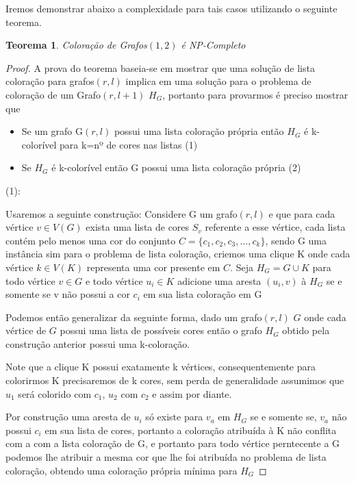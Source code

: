 \documentclass[a4paper,oneside,12pt]{book}
\newtheorem{teorema}{Teorema}
\begin{document}
Iremos demonstrar abaixo a complexidade para tais casos utilizando o seguinte teorema. 
    \begin{teorema}
      Coloração de Grafos$(1,2)$ é NP-Completo
    \end{teorema}
    \begin{proof}
      A prova do teorema baseia-se em mostrar que uma solução de lista coloração para grafos$(r,l)$ implica em uma solução para o problema de coloração de um Grafo$(r,l+1)$ $H_G$, portanto para provarmos é preciso mostrar que
      \begin{itemize}
        \item Se um grafo G$(r,l)$ possui uma lista coloração própria então $H_G$ é k-colorível para k=nº de cores nas listas (1)
        \item Se $H_G$ é k-colorível então G possui uma lista coloração própria (2)
      \end{itemize}
      (1):\newline
      
      Usaremos a seguinte construção:\newline
      Considere G um grafo$(r,l)$ e que para cada vértice $v \in V(G)$ exista uma lista de cores $S_v$ referente a esse vértice, cada lista contém pelo menos uma cor do conjunto $C = \{c_1,c_2,c_3,...,c_k \}$, sendo G uma instância sim para o problema de lista coloração, criemos uma clique K onde cada vértice $k \in V(K)$ representa uma cor presente em $C$. Seja $H_G = G \cup K$ para todo vértice $v \in G$ e todo vértice $u_i \in K$ adicione uma aresta $(u_i,v)$ à $H_G$ se e somente se v não possui a cor $c_i$ em sua lista coloração em G
      
      Podemos então generalizar da seguinte forma, dado um grafo$(r,l)$ $G$ onde cada vértice de $G$ possui uma lista de possíveis cores então o grafo $H_G$ obtido pela construção anterior possui uma k-coloração.
      
      Note que a clique K possui exatamente k vértices, consequentemente para colorirmos K precisaremos de k cores, sem perda de generalidade assumimos que $u_1$ será colorido com $c_1$, $u_2$ com $c_2$ e assim por diante.
      
      Por construção uma aresta de $u_i$ só existe para $v_a$ em $H_G$ se e somente se, $v_a$ não possui $c_i$ em sua lista de cores, portanto a coloração atribuída à K não conflita com a com a lista coloração de G, e portanto para todo vértice perntecente a G podemos lhe atribuir a mesma cor que lhe foi atribuída no problema de lista coloração, obtendo uma coloração própria mínima para $H_G$
      

\end{proof}
\end{document}
